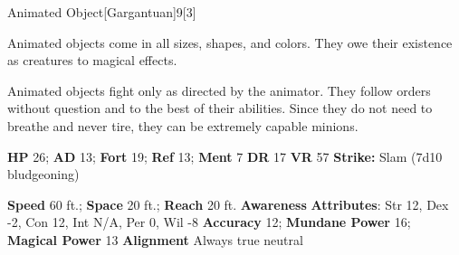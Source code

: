   
  \begin{monsection}{Animated Object}[Gargantuan]{9}[3]
    \vspace{-1em}\vspace{-1em}
    \vspace{0em}

    
    Animated objects come in all sizes, shapes, and colors. They owe their existence as creatures to magical effects.

    Animated objects fight only as directed by the animator. They follow orders without question and to the best of their abilities. Since they do not need to breathe and never tire, they can be extremely capable minions.
  
    

    \begin{spellcontent}
      \begin{spelltargetinginfo}
        \pari \textbf{HP} 26;
          \textbf{AD} 13;
          \textbf{Fort} 19;
          \textbf{Ref} 13;
          \textbf{Ment} 7
        \pari \textbf{DR} 17
        \pari \textbf{VR} 57
        \pari \textbf{Strike:}
            Slam  (7d10 bludgeoning)
      \end{spelltargetinginfo}
    \end{spellcontent}
    \begin{monsterfooter}
      \pari \textbf{Speed} 60 ft.;
        \textbf{Space} 20 ft.;
        \textbf{Reach} 20 ft.
      \pari \textbf{Awareness} 
      \pari \textbf{Attributes}:
        Str 12, Dex -2,
        Con 12, Int N/A,
        Per 0, Wil -8
      \pari \textbf{Accuracy} 12;
        \textbf{Mundane Power} 16;
      \textbf{Magical Power} 13
      \pari \textbf{Alignment} Always true neutral
    \end{monsterfooter}
  \end{monsection}
  
